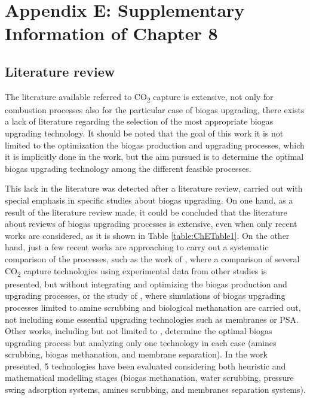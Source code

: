\chapter{Appendix E: Supplementary Information of Chapter 8}

\begin{refsection}[referencesCh7]

\section{Literature review}
The literature available referred to CO\textsubscript{2} capture is extensive, not only for combustion processes also for the particular case of biogas upgrading, there exists a lack of literature regarding the selection of the most appropriate biogas upgrading technology. It should be noted that the goal of this work it is not limited to the optimization the biogas production and upgrading processes, which it is implicitly done in the work, but the aim pursued is to determine the optimal biogas upgrading technology among the different feasible processes.

This lack in the literature was detected after a literature review, carried out with special emphasis in specific studies about biogas upgrading. On one hand, as a result of the literature review made, it could be concluded that the literature about reviews of biogas upgrading processes is extensive, even when only recent works are considered, as it is shown in Table \ref{table:ChETable1}. On the other hand, just a few recent works are approaching to carry out a systematic comparison of the processes, such as the work of \citet{collet2017techno}, where a comparison of several CO\textsubscript{2} capture technologies using experimental data from other studies is presented, but without  integrating and optimizing the biogas production and upgrading processes, or the study of \citet{vo2018techno}, where simulations of biogas upgrading processes limited to amine scrubbing and biological methanation are carried out, not including some essential upgrading technologies such as membranes or PSA. Other works, including but not limited to \citet{capra2018biogas, curto2019renewable, gilassi2019optimizing}, determine the optimal biogas upgrading process but analyzing only one technology in each case (amines scrubbing, biogas methanation, and membrane separation). In the work presented, 5 technologies have been evaluated considering both heuristic and mathematical modelling stages (biogas methanation, water scrubbing, pressure swing adsorption systems, amines scrubbing, and membranes separation systems).


\end{refsection}
